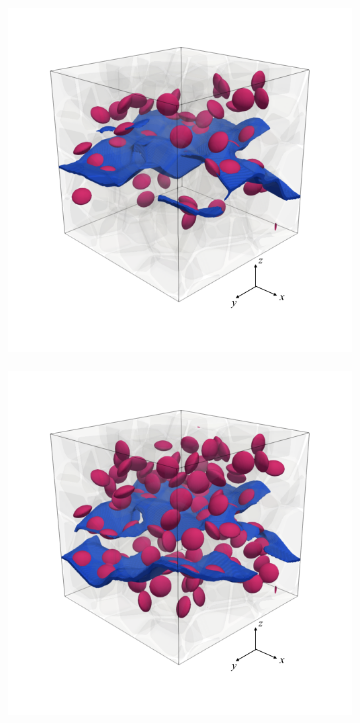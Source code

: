 \begin{figure}[!htb]
\begin{subfigure}{0.32\textwidth}
    \caption{}
    \label{b150_ini}
  \end{subfigure}
  \begin{subfigure}{0.32\textwidth}
    \centering
    \includegraphics[width=\textwidth]{Chapter3/figures/b50_end}
    \caption{}
    \label{b50_end}
  \end{subfigure}
  \begin{subfigure}{0.32\textwidth}
    \centering
    \includegraphics[width=\textwidth]{Chapter3/figures/b100_end}

\end{subfigure}
\end{figure}
